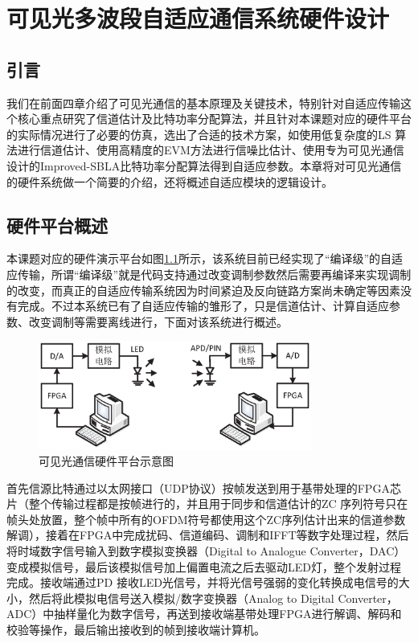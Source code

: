 \chapter{可见光多波段自适应通信系统硬件设计}
\section{引言}
我们在前面四章介绍了可见光通信的基本原理及关键技术，特别针对自适应传输这个核心重点研究了信道估计及比特功率分配算法，并且针对本课题对应的硬件平台的实际情况进行了必要的仿真，选出了合适的技术方案，如使用低复杂度的LS 算法进行信道估计、使用高精度的EVM方法进行信噪比估计、使用专为可见光通信设计的Improved-SBLA比特功率分配算法得到自适应参数。本章将对可见光通信的硬件系统做一个简要的介绍，还将概述自适应模块的逻辑设计。
\section{硬件平台概述}
本课题对应的硬件演示平台如图\ref{fig:Hardware_Structure}所示，该系统目前已经实现了“编译级”的自适应传输，所谓“编译级”就是代码支持通过改变调制参数然后需要再编译来实现调制的改变，而真正的自适应传输系统因为时间紧迫及反向链路方案尚未确定等因素没有完成。不过本系统已有了自适应传输的雏形了，只是信道估计、计算自适应参数、改变调制等需要离线进行，下面对该系统进行概述。
\begin{figure}[htbp]
\centering
\includegraphics[width=0.8\textwidth]{figures/chapter-5/Hardware_Structure.eps}
\caption{可见光通信硬件平台示意图}
\label{fig:Hardware_Structure}
\end{figure}

首先信源比特通过以太网接口（UDP协议）按帧发送到用于基带处理的FPGA芯片（整个传输过程都是按帧进行的，并且用于同步和信道估计的ZC 序列符号只在帧头处放置，整个帧中所有的OFDM符号都使用这个ZC序列估计出来的信道参数解调），接着在FPGA中完成扰码、信道编码、调制和IFFT等数字处理过程，然后将时域数字信号输入到数字模拟变换器（Digital to Analogue Converter，DAC）变成模拟信号，最后该模拟信号加上偏置电流之后去驱动LED灯，整个发射过程完成。接收端通过PD 接收LED光信号，并将光信号强弱的变化转换成电信号的大小，然后将此模拟电信号送入模拟/数字变换器（Analog to Digital Converter，ADC）中抽样量化为数字信号，再送到接收端基带处理FPGA进行解调、解码和校验等操作，最后输出接收到的帧到接收端计算机。
